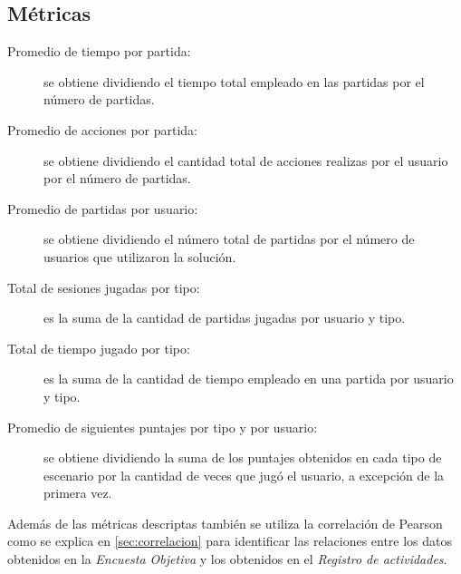 \subsection{Métricas}

\begin{description}
\item[Promedio de tiempo por partida:] se obtiene dividiendo el tiempo total empleado 
    en las partidas por el número de partidas.
\item[Promedio de acciones por partida:] se obtiene dividiendo el cantidad total de 
    acciones realizas por el usuario por el número de partidas.
\item[Promedio de partidas por usuario:] se obtiene dividiendo el número total de partidas
    por el número de usuarios que utilizaron la solución.
\item[Total de sesiones jugadas por tipo:] es la suma de la cantidad de partidas jugadas por 
    usuario y tipo.
\item[Total de tiempo jugado por tipo:] es la suma de la cantidad de tiempo empleado en una 
    partida por usuario y tipo.
\item[Promedio de siguientes puntajes por tipo y por usuario:] se obtiene dividiendo la suma 
    de los puntajes obtenidos en cada tipo de escenario por la cantidad de veces que jugó el 
    usuario, a excepción de la primera vez.
\end{description}

Además de las métricas descriptas también se utiliza la correlación de Pearson como se 
explica en \ref{sec:correlacion} para identificar las relaciones entre los datos obtenidos en 
la \emph{Encuesta Objetiva} y los obtenidos en el \emph{Registro de actividades}.
